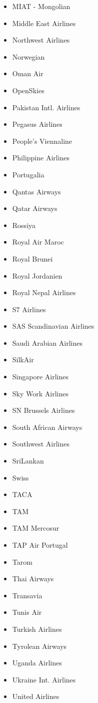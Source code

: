 \begin{itemize}
\begin{itemize}
	\item MIAT - Mongolian
	\item Middle East Airlines
	\item Northwest Airlines
	\item Norwegian
	\item Oman Air
	\item OpenSkies
	\item Pakistan Intl. Airlines
	\item Pegasus Airlines
	\item People's Viennaline
	\item Philippine Airlines
	\item Portugalia
	\item Qantas Airways
	\item Qatar Airways
	\item Rossiya
	\item Royal Air Maroc
	\item Royal Brunei
	\item Royal Jordanien
	\item Royal Nepal Airlines
	\item S7 Airlines
	\item SAS Scandinavian Airlines
	\item Saudi Arabian Airlines
	\item SilkAir
	\item Singapore Airlines
	\item Sky Work Airlines
	\item SN Brussels Airlines
	\item South African Airways
	\item Southwest Airlines
	\item SriLankan
	\item Swiss
	\item TACA
	\item TAM
	\item TAM Mercosur
	\item TAP Air Portugal
	\item Tarom
	\item Thai Airways
	\item Transavia
	\item Tunis Air
	\item Turkish Airlines
	\item Tyrolean Airways
	\item Uganda Airlines
	\item Ukraine Int. Airlines
	\item United Airlines

\end{itemize}
\end{itemize}
